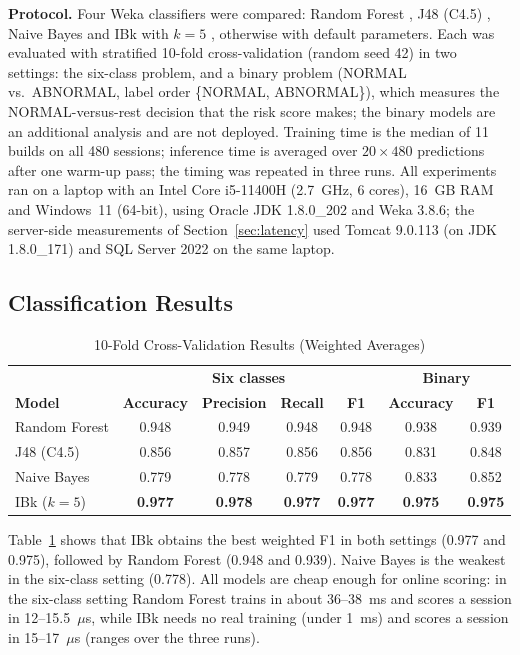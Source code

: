 \documentclass[conference, onecolumn]{IEEEtran}
\begin{document}
\textbf{Protocol.} Four Weka classifiers were compared: Random Forest \cite{breiman2001rf}, J48 (C4.5)
\cite{quinlan1993c45}, Naive Bayes \cite{john1995nb} and IBk with $k = 5$ \cite{aha1991ibl}, otherwise with default
parameters. Each was evaluated with stratified 10-fold cross-validation \cite{kohavi1995cv} (random seed 42) in two
settings: the six-class problem, and a binary problem (NORMAL vs.\ ABNORMAL, label order \{NORMAL, ABNORMAL\}), which
measures the NORMAL-versus-rest decision that the risk score makes; the binary models are an additional analysis and
are not deployed. Training time is the median of 11 builds on all 480 sessions; inference time is averaged
over $20 \times 480$ predictions after one warm-up pass; the timing was repeated in three runs.
All experiments ran on a laptop with an Intel Core i5-11400H (2.7~GHz, 6 cores), 16~GB RAM and Windows~11 (64-bit),
using Oracle JDK 1.8.0\_202 and Weka 3.8.6; the server-side measurements of Section~\ref{sec:latency} used Tomcat
9.0.113 (on JDK 1.8.0\_171) and SQL Server 2022 on the same laptop.

\subsection{Classification Results}

\begin{table}[H]
\renewcommand{\arraystretch}{1.3}
\centering
\caption{10-Fold Cross-Validation Results (Weighted Averages)}
\label{tab:ml}
\begin{tabular}{l c c c c c c}
\hline
 & \multicolumn{4}{c}{\textbf{Six classes}} & \multicolumn{2}{c}{\textbf{Binary}} \\
\textbf{Model} & \textbf{Accuracy} & \textbf{Precision} & \textbf{Recall} & \textbf{F1} & \textbf{Accuracy} & \textbf{F1} \\
\hline
Random Forest & 0.948 & 0.949 & 0.948 & 0.948 & 0.938 & 0.939 \\
J48 (C4.5)    & 0.856 & 0.857 & 0.856 & 0.856 & 0.831 & 0.848 \\
Naive Bayes   & 0.779 & 0.778 & 0.779 & 0.778 & 0.833 & 0.852 \\
IBk ($k=5$)   & \textbf{0.977} & \textbf{0.978} & \textbf{0.977} & \textbf{0.977} & \textbf{0.975} & \textbf{0.975} \\
\hline
\end{tabular}
\end{table}

Table~\ref{tab:ml} shows that IBk obtains the best weighted F1 in both settings (0.977 and 0.975),
followed by Random Forest (0.948 and 0.939). Naive Bayes is the weakest in the six-class setting (0.778). All models
are cheap enough for online scoring: in the six-class setting Random Forest trains in about 36--38~ms and scores a
session in 12--15.5~$\mu$s, while IBk needs no real training (under 1~ms) and scores a session in 15--17~$\mu$s
(ranges over the three runs).
\end{document}
